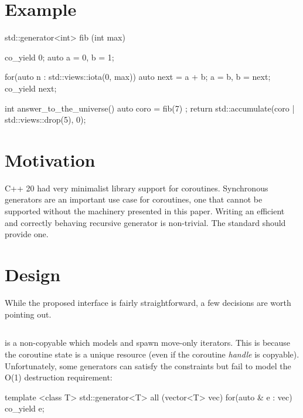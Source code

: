 \documentclass{wg21}
\begin{document}
\section{Example}

\begin{colorblock}
    std::generator<int> fib (int max) {
        co_yield 0;
        auto a = 0, b = 1;

        for(auto n : std::views::iota(0, max))  {
            auto next = a + b;
            a = b, b = next;
            co_yield next;
        }
    }

    int answer_to_the_universe() {
        auto coro = fib(7) ;
        return std::accumulate(coro | std::views::drop(5), 0);
    }

\end{colorblock}

\section{Motivation}

C++ 20 had very minimalist library support for coroutines.
Synchronous generators are an important use case for coroutines, one that cannot be supported without
the machinery presented in this paper.
Writing an efficient and correctly behaving recursive generator is non-trivial. The standard should provide one.


\section{Design}

While the proposed  interface is fairly straightforward, a few decisions are worth pointing out.

\subsection{}

 is a non-copyable  which models  and spawn move-only iterators.
This is because the coroutine state is a unique resource (even if the coroutine \textit{handle} is copyable).
Unfortunately, some generators can satisfy the  constraints but fail to model the  O(1)
destruction requirement:

\begin{colorblock}

    template <class T>
    std::generator<T> all (vector<T> vec) {
        for(auto & e : vec)  {
            co_yield e;
        }
    }

\end{colorblock}
\end{document}
